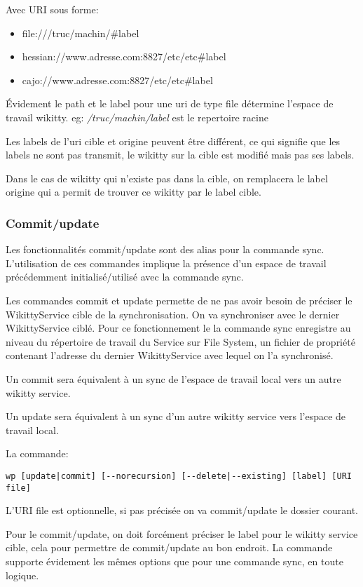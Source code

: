 Avec URI sous forme: 
\begin{itemize}
\item file:///truc/machin/\#label
\item hessian://www.adresse.com:8827/etc/etc\#label
\item cajo://www.adresse.com:8827/etc/etc\#label
\end{itemize}

Évidement le path et le label pour une uri de type file détermine l'espace de
travail wikitty. eg: \emph{/truc/machin/label} est le repertoire racine

Les labels de l'uri cible et origine peuvent être différent, ce qui signifie que
les labels ne sont pas transmit, le wikitty sur la cible est modifié mais pas 
ses labels.

Dans le cas de wikitty qui n'existe pas dans la cible, on remplacera le label
origine qui a permit de trouver ce wikitty par le label cible. 

\subsubsection{Commit/update}

Les fonctionnalités commit/update sont des alias pour la commande sync.
L'utilisation de ces commandes implique la présence d'un espace de travail
précédemment initialisé/utilisé avec la commande sync.

Les commandes commit et update permette de ne pas avoir besoin de préciser le
WikittyService cible de la synchronisation. On va synchroniser avec le dernier
WikittyService ciblé. Pour ce fonctionnement le la commande sync enregistre
au niveau du répertoire de travail du Service sur File System, un fichier
de propriété contenant l'adresse du dernier WikittyService avec lequel on l'a 
synchronisé. 


Un commit sera équivalent à un sync de l'espace de travail local vers un autre
wikitty service. 

Un update sera équivalent à un sync d'un autre wikitty service vers l'espace de
travail local.

La commande:

\verb!wp [update|commit] [--norecursion] [--delete|--existing] [label] [URI file]!

L'URI file est optionnelle, si pas précisée on va commit/update le dossier 
courant.

Pour le commit/update, on doit forcément préciser le label pour le wikitty 
service cible, cela pour permettre de commit/update au bon endroit.
La commande supporte évidement les mêmes options que pour une commande sync, en
toute logique.


